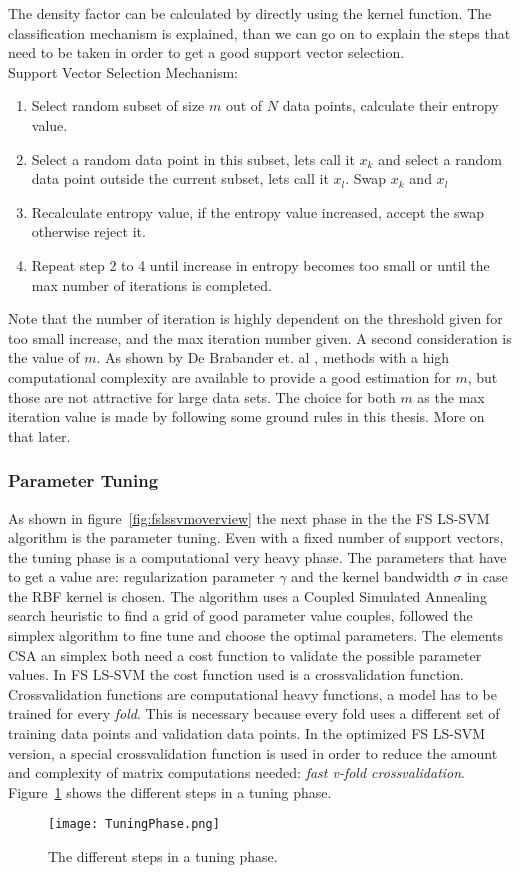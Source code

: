 The density factor can be calculated by directly using the kernel function. 
The classification mechanism is explained, than we can go on to explain the steps that need to be taken in order to get a good support vector selection.\\
Support Vector Selection Mechanism:\cite{Suykens2002}\\
\begin{enumerate}
	\item Select random subset of size $m$ out of $N$ data points, calculate their entropy value.
	\item Select a random data point in this subset, lets call it $x_k$ and select a random data point outside the current subset, lets call it $x_l$. Swap $x_k$ and $x_l$
	\item Recalculate entropy value, if the entropy value increased, accept the swap otherwise reject it.
	\item Repeat step 2 to 4 until increase in entropy becomes too small or until the max number of iterations is completed.
\end{enumerate}
Note that the number of iteration is highly dependent on the threshold given for too small increase, and the max iteration number given.
A second consideration is the value of $m$.
As shown by De Brabander et. al \cite{Optimized2010:article}, methods with a high computational complexity are available to provide a good estimation for $m$, but those are not attractive for large data sets.
The choice for both $m$ as the max iteration value is made by following some ground rules in this thesis. 
More on that later.
\subsubsection{Parameter Tuning}
As shown in figure~\ref{fig:fslssvmoverview} the next phase in the the FS LS-SVM algorithm is the parameter tuning.
Even with a fixed number of support vectors, the tuning phase is a computational very heavy phase.
The parameters that have to get a value are: regularization parameter $\gamma$ and the kernel bandwidth $\sigma$ in case the RBF kernel is chosen.
The algorithm uses a Coupled Simulated Annealing search heuristic to find a grid of good parameter value couples, followed the simplex  algorithm to fine tune and choose the optimal parameters.
The elements CSA an simplex both need a cost function to validate the possible parameter values.
In FS LS-SVM the cost function used is a crossvalidation function. 
Crossvalidation functions are computational heavy functions, a model has to be trained for every \textit{fold}.
This is necessary because every fold uses a different set of training data points and validation data points.
In the optimized FS LS-SVM version, a special crossvalidation function is used in order to reduce the amount and complexity of matrix computations needed: \textit{fast v-fold crossvalidation}.\cite{Optimized2010:article}
Figure~\ref{fig:fslssvmtuningphase} shows the different steps in a tuning phase.
\begin{figure}
	\centering
	\texttt{[image: TuningPhase.png]}
	\caption{The different steps in a tuning phase.}
	\label{fig:fslssvmtuningphase}
\end{figure}
